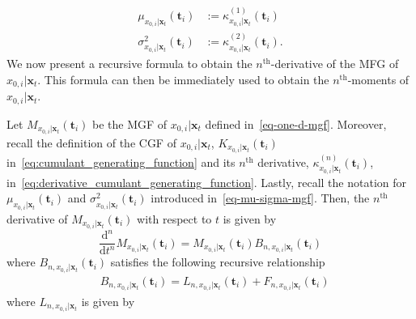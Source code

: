 \begin{equation}
\begin{aligned}
\label{eq-mu-sigma-mgf}
    \mu_{x_{0,i} \vert \mathbf{x}_t}(\mathbf{t}_{i})  &:= \kappa^{(1)}_{x_{0,i} \vert \mathbf{x}_t}(\mathbf{t}_{i}) \\
    \sigma^2_{x_{0,i} \vert \mathbf{x}_t}(\mathbf{t}_{i}) &:= \kappa^{(2)}_{x_{0,i} \vert \mathbf{x}_t}(\mathbf{t}_{i}).
\end{aligned}
\end{equation}
We now present a recursive formula to obtain the $n^{\text{th}}$-derivative of the MFG of $x_{0,i}\vert \mathbf{x}_{t}$. This formula can then be immediately used to obtain the $n^{\text{th}}$-moments of $x_{0,i}\vert \mathbf{x}_{t}$.
\begin{proposition}
\label{prop-recursive-derivative-mgf}
Let $M_{x_{0,i}\vert \mathbf{x}_{t}}(\mathbf{t}_{i})$ be the MGF of $x_{0,i}\vert \mathbf{x}_{t}$ defined in~\eqref{eq-one-d-mgf}. Moreover, recall the definition of the CGF of $x_{0,i}\vert \mathbf{x}_{t}$, $K_{x_{0,i} \vert \mathbf{x}_t}(\mathbf{t}_{i})$ in~\eqref{eq:cumulant_generating_function} and its $n^{\text{th}}$ derivative, $\kappa^{(n)}_{x_{0,i} \vert \mathbf{x}_t}(\mathbf{t}_{i})$, in~\eqref{eq:derivative_cumulant_generating_function}. Lastly, recall the notation for $\mu_{x_{0,i} \vert \mathbf{x}_t}(\mathbf{t}_{i})$ and $\sigma^2_{x_{0,i} \vert \mathbf{x}_t}(\mathbf{t}_{i})$ introduced in~\eqref{eq-mu-sigma-mgf}. Then, the $n^{\text{th}}$ derivative of $M_{x_{0,i}\vert \mathbf{x}_{t}}(\mathbf{t}_{i})$ with respect to $t$ is given by 
\begin{equation}
\frac{\mathrm{d}^{n}}{\mathrm{d}t^{n}}M_{{x}_{0,i}\vert\mathbf{x}_{t}} (\mathbf{t}_i) = M_{{x}_{0,i}\vert\mathbf{x}_{t}}(\mathbf{t}_i) B_{n,{x}_{0,i}|{\mathbf{x}_t}}(\mathbf{t}_i)
\end{equation}
where $B_{n, {x}_{0,i}|{\mathbf{x}_t}}(\mathbf{t}_i)$ satisfies the following recursive relationship
\begin{equation}
\label{eq-recursion-derivative}
\begin{aligned}
&B_{n,{x}_{0,i}|{\mathbf{x}_t}}(\mathbf{t}_i)= L_{n,{x}_{0,i}|{\mathbf{x}_t}}(\mathbf{t}_i) + F_{n,{x}_{0,i}|{\mathbf{x}_t}}(\mathbf{t}_i)
\end{aligned}
\end{equation}
where $L_{n,{x}_{0,i}|{\mathbf{x}_t}}$ is given by
\begin{equation}

\end{equation}
\end{proposition}
